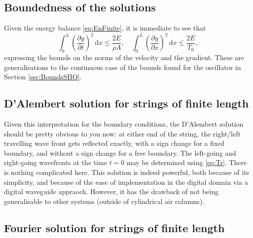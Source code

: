 \documentclass[11pt,twoside,a4paper,english]{book}
\begin{document}
\subsection{Boundedness of the solutions}\label{sec:BoundWECnt}

Given the energy balance \eqref{eq:EnFinite}, it is immediate to see that
\begin{equation}
\int_0^L \left( \frac{\partial y}{\partial t} \right)^2 \, \mathrm{d}x \leq \frac{2E}{\rho A}, \quad \int_0^L \left( \frac{\partial y}{\partial x} \right)^2 \, \mathrm{d}x \leq \frac{2E}{T_0},
\end{equation}
expressing the bounds on the norms of the velocity and the gradient. These are generalisations to the continuous case of the bounds found for the oscillator in Section \ref{sec:BoundsSHO}. 


\subsection{D'Alembert solution for strings of finite length}
Given this interpretation for the boundary conditions, the D'Alembert solution should be pretty obvious to you now: at either end of the string, the right/left travelling wave front gets reflected exactly, with a sign change for a fixed boundary, and without a sign change for a free boundary. The left-going and right-going wavefronts at the time $t=0$ may be determined using \eqref{eq:Tr}. There is nothing complicated here. This solution is indeed powerful, both because of its simplicity, and because of the ease of implementation in the digital domain via a digital waveguide appraoch. However, it has the drawback of not being generalisable to other systems (outside of cylindrical air columns).


\subsection{Fourier solution for strings of finite length}
\end{document}
